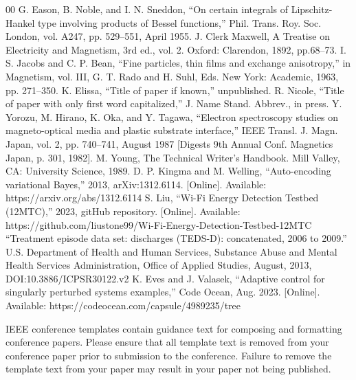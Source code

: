 \documentclass[conference]{IEEEtran}
\begin{document}
\begin{thebibliography}{00}
     G. Eason, B. Noble, and I. N. Sneddon, ``On certain integrals of Lipschitz-Hankel type involving products of Bessel functions,'' Phil. Trans. Roy. Soc. London, vol. A247, pp. 529--551, April 1955.
     J. Clerk Maxwell, A Treatise on Electricity and Magnetism, 3rd ed., vol. 2. Oxford: Clarendon, 1892, pp.68--73.
     I. S. Jacobs and C. P. Bean, ``Fine particles, thin films and exchange anisotropy,'' in Magnetism, vol. III, G. T. Rado and H. Suhl, Eds. New York: Academic, 1963, pp. 271--350.
     K. Elissa, ``Title of paper if known,'' unpublished.
     R. Nicole, ``Title of paper with only first word capitalized,'' J. Name Stand. Abbrev., in press.
     Y. Yorozu, M. Hirano, K. Oka, and Y. Tagawa, ``Electron spectroscopy studies on magneto-optical media and plastic substrate interface,'' IEEE Transl. J. Magn. Japan, vol. 2, pp. 740--741, August 1987 [Digests 9th Annual Conf. Magnetics Japan, p. 301, 1982].
     M. Young, The Technical Writer's Handbook. Mill Valley, CA: University Science, 1989.
     D. P. Kingma and M. Welling, ``Auto-encoding variational Bayes,'' 2013, arXiv:1312.6114. [Online]. Available: https://arxiv.org/abs/1312.6114
     S. Liu, ``Wi-Fi Energy Detection Testbed (12MTC),'' 2023, gitHub repository. [Online]. Available: https://github.com/liustone99/Wi-Fi-Energy-Detection-Testbed-12MTC
     ``Treatment episode data set: discharges (TEDS-D): concatenated, 2006 to 2009.'' U.S. Department of Health and Human Services, Substance Abuse and Mental Health Services Administration, Office of Applied Studies, August, 2013, DOI:10.3886/ICPSR30122.v2
     K. Eves and J. Valasek, ``Adaptive control for singularly perturbed systems examples,'' Code Ocean, Aug. 2023. [Online]. Available: https://codeocean.com/capsule/4989235/tree
\end{thebibliography}

\vspace{12pt}
\color{red}
IEEE conference templates contain guidance text for composing and formatting conference papers. Please ensure that all template text is removed from your conference paper prior to submission to the conference. Failure to remove the template text from your paper may result in your paper not being published.
\end{document}
